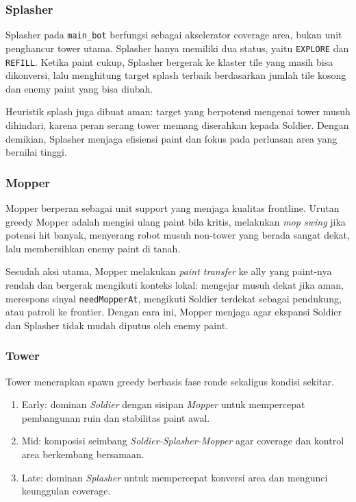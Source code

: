 \subsubsection{Splasher}

Splasher pada \texttt{main\_bot} berfungsi sebagai akselerator coverage area, bukan unit penghancur tower utama. Splasher hanya memiliki dua status, yaitu \texttt{EXPLORE} dan \texttt{REFILL}. Ketika paint cukup, Splasher bergerak ke klaster tile yang masih bisa dikonversi, lalu menghitung target splash terbaik berdasarkan jumlah tile kosong dan enemy paint yang bisa diubah.

Heuristik splash juga dibuat aman: target yang berpotensi mengenai tower musuh dihindari, karena peran serang tower memang diserahkan kepada Soldier. Dengan demikian, Splasher menjaga efisiensi paint dan fokus pada perluasan area yang bernilai tinggi.

\subsubsection{Mopper}

Mopper berperan sebagai unit support yang menjaga kualitas frontline. Urutan greedy Mopper adalah mengisi ulang paint bila kritis, melakukan \textit{mop swing} jika potensi hit banyak, menyerang robot musuh non-tower yang berada sangat dekat, lalu membersihkan enemy paint di tanah.

Sesudah aksi utama, Mopper melakukan \textit{paint transfer} ke ally yang paint-nya rendah dan bergerak mengikuti konteks lokal: mengejar musuh dekat jika aman, merespons sinyal \texttt{needMopperAt}, mengikuti Soldier terdekat sebagai pendukung, atau patroli ke frontier. Dengan cara ini, Mopper menjaga agar ekspansi Soldier dan Splasher tidak mudah diputus oleh enemy paint.

\subsubsection{Tower}

Tower menerapkan spawn greedy berbasis fase ronde sekaligus kondisi sekitar.
\begin{enumerate}
    \item Early: dominan \textit{Soldier} dengan sisipan \textit{Mopper} untuk mempercepat pembangunan ruin dan stabilitas paint awal.
    \item Mid: komposisi seimbang \textit{Soldier-Splasher-Mopper} agar coverage dan kontrol area berkembang bersamaan.
    \item Late: dominan \textit{Splasher} untuk mempercepat konversi area dan mengunci keunggulan coverage.
\end{enumerate}

